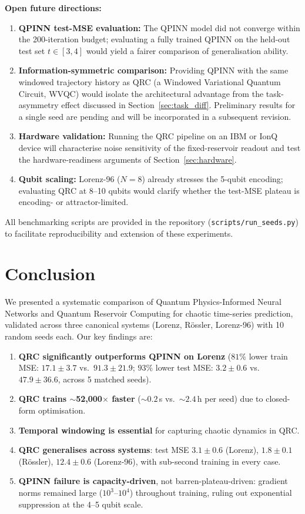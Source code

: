\documentclass[11pt,a4paper]{article}
\begin{document}
\textbf{Open future directions:}
\begin{enumerate}
    \item \textbf{QPINN test-MSE evaluation:} The QPINN model did not
    converge within the 200-iteration budget; evaluating a fully trained
    QPINN on the held-out test set $t \in [3,4]$ would yield a fairer
    comparison of generalisation ability.
    \item \textbf{Information-symmetric comparison:} Providing QPINN with
    the same windowed trajectory history as QRC (a Windowed Variational
    Quantum Circuit, WVQC) would isolate the architectural advantage from
    the task-asymmetry effect discussed in Section~\ref{sec:task_diff}.
    Preliminary results for a single seed are pending and will be incorporated
    in a subsequent revision.
    \item \textbf{Hardware validation:} Running the QRC pipeline on an IBM
    or IonQ device will characterise noise sensitivity of the fixed-reservoir
    readout and test the hardware-readiness arguments of
    Section~\ref{sec:hardware}.
    \item \textbf{Qubit scaling:} Lorenz-96 ($N=8$) already stresses the
    5-qubit encoding; evaluating QRC at 8--10 qubits would clarify whether
    the test-MSE plateau is encoding- or attractor-limited.
\end{enumerate}

All benchmarking scripts are provided in the repository
(\texttt{scripts/run\_seeds.py}) to facilitate reproducibility and
extension of these experiments.

\section{Conclusion}

We presented a systematic comparison of Quantum Physics-Informed Neural Networks and Quantum Reservoir Computing for chaotic time-series prediction, validated across three canonical systems (Lorenz, R\"{o}ssler, Lorenz-96) with 10 random seeds each. Our key findings are:

\begin{enumerate}
    \item \textbf{QRC significantly outperforms QPINN on Lorenz} ($81\%$ lower train MSE: $17.1\pm3.7$ vs.\ $91.3\pm21.9$; $93\%$ lower test MSE: $3.2\pm0.6$ vs.\ $47.9\pm36.6$, across 5 matched seeds).
    \item \textbf{QRC trains $\sim$52,000$\times$ faster} (${\sim}0.2$\,s vs.\ ${\sim}2.4$\,h per seed) due to closed-form optimisation.
    \item \textbf{Temporal windowing is essential} for capturing chaotic dynamics in QRC.
    \item \textbf{QRC generalises across systems}: test MSE $3.1\pm0.6$ (Lorenz), $1.8\pm0.1$ (R\"{o}ssler), $12.4\pm0.6$ (Lorenz-96), with sub-second training in every case.
    \item \textbf{QPINN failure is capacity-driven}, not barren-plateau-driven: gradient norms remained large ($10^3$--$10^4$) throughout training, ruling out exponential suppression at the 4--5 qubit scale.
\end{enumerate}
\end{document}
